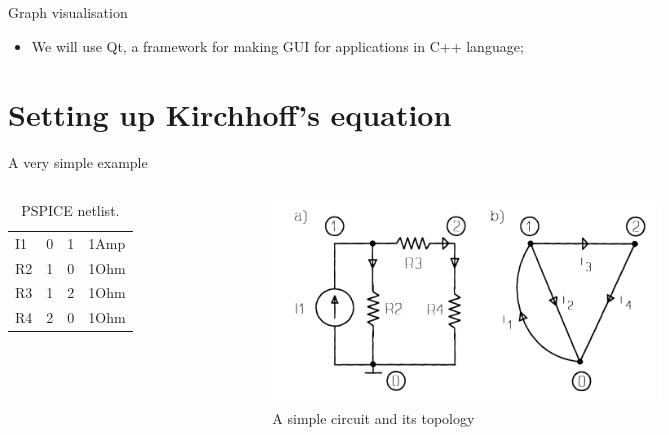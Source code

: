 \documentclass[xcolor=dvipsnames]{beamer}
\begin{document}
\begin{frame}{Graph visualisation}
\begin{itemize}
	\item We will use Qt, a framework for making GUI for applications in C++ language;
\end{itemize}
	
\end{frame}

\section{Setting up Kirchhoff's equation}

\begin{frame}{A very simple example}
    \begin{columns}
        \begin{column}{.45\textwidth}
            \begin{table}[h!]
	    	\caption{PSPICE netlist.}
	    	\label{tab:netlist}
	   		 \begin{tabular}{l|l|l|l} %
	      		\hline
	      		I1 & 0 & 1 & 1Amp\\
	      		R2 & 1 & 0 & 1Ohm\\
	      		R3 & 1 & 2 & 1Ohm\\
	      		R4 & 2 & 0 & 1Ohm
	    	\end{tabular}
			\end{table}
        \end{column}
		\begin{column}{.75\textwidth}
         \begin{figure}[!ht]
  			\centering
    		\includegraphics[width=0.7\textwidth]{circuitt.png}
   			 \caption[figure 4]{A simple circuit and its topology}
    		\label{fig:eg4}
    	 \end{figure}
      	\end{column}
    \end{columns}
\end{frame}
\end{document}
